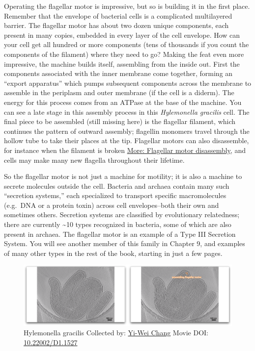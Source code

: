 \documentclass[]{tufte-book}
\begin{document}
Operating the flagellar motor is impressive, but so is building it in
the first place. Remember that the envelope of bacterial cells is a
complicated multilayered barrier. The flagellar motor has about two
dozen unique components, each present in many copies, embedded in every
layer of the cell envelope. How can your cell get all hundred or more
components (tens of thousands if you count the components of the
filament) where they need to go? Making the feat even more impressive,
the machine builds itself, assembling from the inside out. First the
components associated with the inner membrane come together, forming an
``export apparatus'' which pumps subsequent components across the
membrane to assemble in the periplasm and outer membrane (if the cell is
a diderm). The energy for this process comes from an ATPase at the base
of the machine. You can see a late stage in this assembly process in
this \emph{Hylemonella gracilis} cell. The final piece to be assembled
(still missing here) is the flagellar filament, which continues the
pattern of outward assembly; flagellin monomers travel through the
hollow tube to take their places at the tip. Flagellar motors can also
disassemble, for instance when the filament is broken
\protect\hyperlink{Flagellar_motor_disassembly}{More: Flagellar motor
disassembly}, and cells may make many new flagella throughout their
lifetime.

So the flagellar motor is not just a machine for motility; it is also a
machine to secrete molecules outside the cell. Bacteria and archaea
contain many such ``secretion systems,'' each specialized to transport
specific macromolecules (e.g.~DNA or a protein toxin) across cell
envelopes--both their own and sometimes others. Secretion systems are
classified by evolutionary relatedness; there are currently
\textasciitilde{}10 types recognized in bacteria, some of which are also
present in archaea. The flagellar motor is an example of a Type III
Secretion System. You will see another member of this family in Chapter
9, and examples of many other types in the rest of the book, starting in
just a few pages.





\begin{figure}
\includegraphics{movie_stills/6_3} \caption[Hylemonella gracilis Collected by:
\protect\hyperlink{yi-wei_chang}{Yi-Wei Chang} Movie DOI:
\href{https://doi.org/10.22002/D1.1527}{10.22002/D1.1527}]{Hylemonella gracilis Collected by:
\protect\hyperlink{yi-wei_chang}{Yi-Wei Chang} Movie DOI:
\href{https://doi.org/10.22002/D1.1527}{10.22002/D1.1527}}\label{fig:6-3}
\end{figure}
\end{document}
